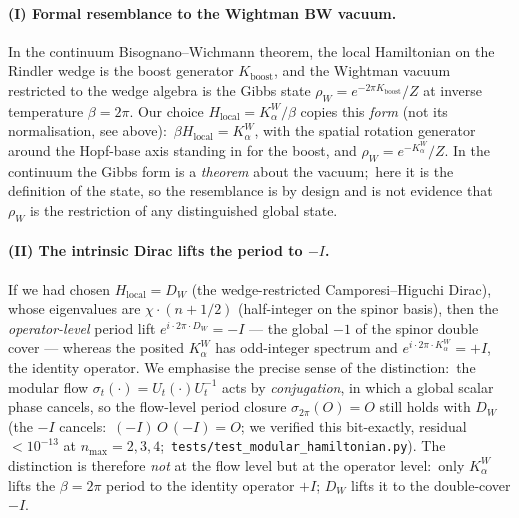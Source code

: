 \documentclass[11pt,a4paper]{article}
\theoremstyle{plain}
\theoremstyle{definition}
\begin{document}
\paragraph{(I) Formal resemblance to the Wightman BW vacuum.}
In the continuum Bisognano--Wichmann theorem, the local Hamiltonian
on the Rindler wedge is the boost generator $K_{\mathrm{boost}}$, and
the Wightman vacuum restricted to the wedge algebra is the Gibbs state
$\rho_W = e^{-2\pi K_{\mathrm{boost}}}/Z$ at inverse temperature
$\beta = 2\pi$. Our choice $H_{\mathrm{local}} = K_\alpha^W / \beta$
copies this \emph{form} (not its normalisation, see above):\
$\beta H_{\mathrm{local}} = K_\alpha^W$, with
the spatial rotation generator around the Hopf-base axis standing in
for the boost, and $\rho_W = e^{-K_\alpha^W}/Z$.  In the continuum the
Gibbs form is a \emph{theorem} about the vacuum;\ here it is the
definition of the state, so the resemblance is by design and is not
evidence that $\rho_W$ is the restriction of any distinguished global
state.

\paragraph{(II) The intrinsic Dirac lifts the period to $-I$.}
If we had chosen $H_{\mathrm{local}} = D_W$ (the wedge-restricted
Camporesi--Higuchi Dirac), whose eigenvalues are $\chi \cdot (n + 1/2)$
(half-integer on the spinor basis), then the \emph{operator-level}
period lift $e^{i \cdot 2\pi \cdot D_W} = -I$ --- the global $-1$ of the
spinor double cover --- whereas the posited $K_\alpha^W$ has
odd-integer spectrum and $e^{i \cdot 2\pi \cdot K_\alpha^W} = +I$, the
identity operator. We emphasise the precise sense of the distinction:\
the modular flow $\sigma_t(\cdot) = U_t (\cdot) U_t^{-1}$ acts by
\emph{conjugation}, in which a global scalar phase cancels, so the
flow-level period closure $\sigma_{2\pi}(O) = O$ still holds with $D_W$
(the $-I$ cancels:\ $(-I)\, O\, (-I) = O$;
we verified this bit-exactly, residual $<10^{-13}$ at $n_{\max} =
2,3,4$;\ \texttt{tests/test\_modular\_hamiltonian.py}). The distinction
is therefore \emph{not} at the flow level but
at the operator level:\ only $K_\alpha^W$ lifts the $\beta = 2\pi$
period to the identity operator $+I$; $D_W$ lifts it to the
double-cover $-I$.
\end{document}
